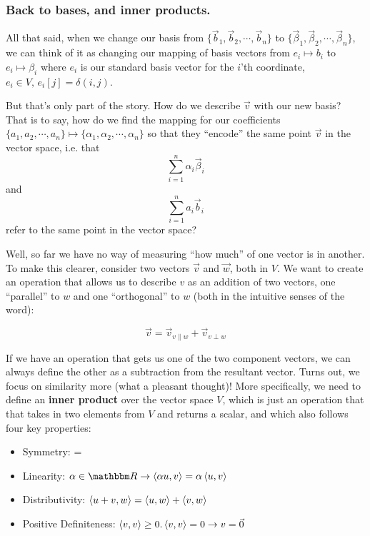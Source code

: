 \documentclass[../main/main.tex]{subfiles}
\begin{document}
\subsubsection*{Back to bases, and inner products.}

All that said, when we change our basis from
\(\{\vec{b}_1, \vec{b}_2, \cdots, \vec{b}_n\}\)
to 
\(\{\vec{\beta}_1, \vec{\beta}_2, \cdots, \vec{\beta}_n\}\),
we can think of it as changing our mapping of basis vectors from 
\(e_i \mapsto b_i\)
to
\(e_i \mapsto \beta_i\)
where \(e_i\) is our standard basis vector for the \(i\)'th coordinate, 
\(e_i \in V, \, e_i[j] = \delta(i,j)\).
\par

But that's only part of the story. How do we describe \(\vec{v}\)
with our new basis? That is to say, how do we find the mapping for our coefficients
\(\{a_1, a_2, \cdots, a_n\} \mapsto \{\alpha_1, \alpha_2, \cdots, \alpha_n\}\)
so that they ``encode'' the same point \(\vec{v}\) in the vector space, i.e. that
\[\sum_{i=1}^{n}\alpha_i\vec{\beta}_i \]
and
\[\sum_{i=1}^{n}a_i\vec{b}_i\]
refer to the same point in the vector space?\par

Well, so far we have no way of measuring ``how much'' of one vector is in another.
To make this clearer, consider two vectors \(\vec{v}\) and \(\vec{w}\), both in \(V\).
We want to create an operation that allows us to describe \(v\) as an addition of two vectors,
one ``parallel'' to \(w\) and one ``orthogonal'' to \(w\)
(both in the intuitive senses of the word):

\[\vec{v} = \vec{v}_{v\parallel w} + \vec{v}_{v\perp w}\]
 

If we have an operation that gets us one of the two component vectors, we can
always define the other as a subtraction from the resultant vector.
Turns out, we focus on similarity more (what a pleasant thought)!
More specifically, we need to 
define an \textbf{inner product} \innerprod{} over the vector space \(V\),
which is just an operation that that takes in two elements from \(V\) and returns a scalar,
and which also follows four key properties:
\begin{itemize}
  \tightlist
  \item
    Symmetry:  = 
  \item
    Linearity: \(\alpha \in \domain{R} 
          \rightarrow \innerprod{\alpha u}{v} = \alpha \innerprod{u}{v}\)
  \item
    Distributivity:
      \(\left<u+v,w\right> = \left<u,w\right> + \left<v,w\right>\)
  \item
    Positive Definiteness:
      \(\left<v,v\right> \geq 0. \left<v,v\right> = 0 \rightarrow v = \vec{0}\)
\end{itemize}
\end{document}
